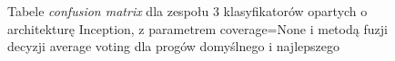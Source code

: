 \documentclass[polish,12pt]{aghthesis}
\begin{document}
\begin{figure}[H]
    \begin{adjustbox}{minipage=1.0\paperwidth, pagecenter}
    \centering
    \qquad
    \end{adjustbox}
    \label{fig:inc-ens-3-None-avg-thresh-matrices}
    \caption{Tabele \textit{confusion matrix} dla zespołu 3 klasyfikatorów opartych o architekturę Inception, z parametrem coverage=None i metodą fuzji decyzji average voting dla progów domyślnego i najlepszego}
\end{figure}
\end{document}
